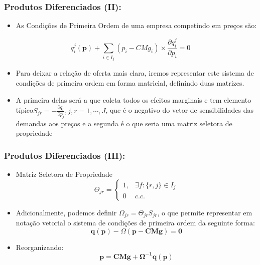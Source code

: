 \documentclass{beamer}
\begin{document}
\begin{frame}\frametitle{Produtos Diferenciados (II):}

\begin{itemize}
\item As Condições de Primeira Ordem de uma empresa competindo em preços
são:
\end{itemize}
\[
q_{i}^{j}(\mathbf{p})+\sum_{i\in I_{j}}(p_{i}-CMg_{i})\times\frac{\partial q_{i}^{j}}{\partial p_{i}}=0
\]

\begin{itemize}
\item Para deixar a relação de oferta mais clara, iremos representar este
sistema de condições de primeira ordem em forma matricial, definindo
duas matrizes. 
\item A primeira delas será a que coleta todos os efeitos marginais e tem
elemento típico$S_{jr}=-\frac{\partial q_{r}}{\partial p_{j}},j,r=1,\cdots,J$,
que é o negativo do vetor de sensibilidades das demandas aos preços
e a segunda é o que seria uma matriz seletora de propriedade
\end{itemize}
\end{frame}

\begin{frame}\frametitle{Produtos Diferenciados (III):}

\begin{itemize}
\item Matriz Seletora de Propriedade
\[
\Theta_{jr}=\begin{cases}
1, & \exists f:\{r,j\}\in I_{j}\\
0 & c.c.
\end{cases}
\]
\item Adicionalmente, podemos definir $\Omega_{jr}=\Theta_{jr}S_{jr}$,
o que permite representar em notação vetorial o sistema de condições
de primeira ordem da seguinte forma:
\[
\mathbf{q(p)}-\Omega(\mathbf{p}-\mathbf{CMg})=\mathbf{0}
\]
\item Reorganizando:
\[
\mathbf{p=CMg+\Omega^{-1}q(p)}
\]
\end{itemize}
\end{frame}
\end{document}
